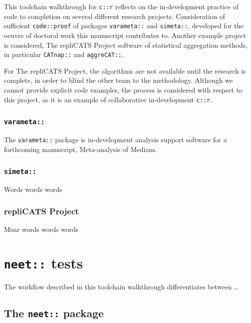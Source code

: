 \documentclass[
]{article}
\begin{document}
This toolchain walkthrough for \texttt{c::r} reflects on the
in-development practice of code to completion on several different
research projects. Consideration of sufficient \texttt{code::proof} of
packages \texttt{varameta::} and \texttt{simeta::}, developed for the
oeuvre of doctoral work this manuscript contributes to. Another example
project is considered, The repliCATS Project software of statistical
aggregation methods, in particular \texttt{CATnap::} and
\texttt{aggreCAT::}.

For The repliCATS Project, the algorithms are not available until the
research is complete, in order to blind the other team to the
methodology. Although we cannot provide explicit code examples, the
process is considered with respect to this project, as it is an example
of collaborative in-development \texttt{c::r}.

\hypertarget{varameta}{%
\subsubsection{\texorpdfstring{\texttt{varameta::}}{varameta::}}\label{varameta}}

The \texttt{varameta::} package is in-development analysis support
software for a forthcoming manuscript, Meta-analysis of Medians.

\hypertarget{simeta}{%
\subsubsection{\texorpdfstring{\texttt{simeta::}}{simeta::}}\label{simeta}}

Words words words

\hypertarget{replicats-project}{%
\subsubsection{repliCATS Project}\label{replicats-project}}

Moar words words words

\hypertarget{neet-tests}{%
\section{\texorpdfstring{\texttt{neet::}
tests}{neet:: tests}}\label{neet-tests}}

The workflow described in this toolchain walkthrough differentiates
between \ldots{}

\hypertarget{the-neet-package}{%
\subsection{\texorpdfstring{The \texttt{neet::}
package}{The neet:: package}}\label{the-neet-package}}
\end{document}
